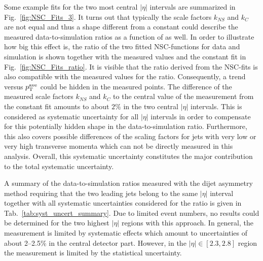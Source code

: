 \begin{description}
Some example fits for the two most central $|\eta|$ intervals are summarized in Fig.~\ref{fig:NSC_Fits_3}. It turns out that typically the scale factors $k_{NS}$ and $k_{C}$ are not equal and thus a shape different from a constant could describe the measured data-to-simulation ratios as a function of \ptave as well. In order to illustrate how big this effect is, the ratio of the two fitted NSC-functions for data and simulation is shown together with the measured values and the constant fit in Fig.~\ref{fig:NSC_Fits_ratio}. It is visible that the ratio derived from the NSC-fits is also compatible with the measured values for the ratio. Consequently, a trend versus $p_{\text{T}}^\mathrm{ave}$ could be hidden in the measured points. The difference of the measured scale factors $k_{NS}$ and $k_{C}$ to the central value of the measurement from the constant fit amounts to about $2\%$ in the two central $|\eta|$ intervals. This is considered as systematic uncertainty for all $|\eta|$ intervals in order to compensate for this potentially hidden shape in the data-to-simulation ratio. Furthermore, this also covers possible differences of the scaling factors for jets with very low or very high transverse momenta which can not be directly measured in this analysis. Overall, this systematic uncertainty constitutes the major contribution to the total systematic uncertainty.
\end{description}
A summary of the data-to-simulation ratios measured with the dijet asymmetry method requiring that the two leading jets belong to the same $|\eta|$ interval together with all systematic uncertainties considered for the ratio is given in Tab.~\ref{tab:syst_uncert_summary}. Due to limited event numbers, no results could be determined for the two highest $|\eta|$ regions with this approach. In general, the measurement is limited by systematic effects which amount to uncertainties of about 2--2.5\% in the central detector part. However, in the $|\eta| \in [2.3, 2.8]$ region the measurement is limited by the statistical uncertainty.   

